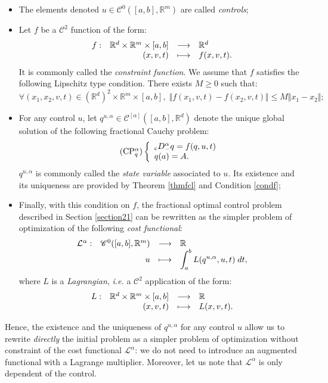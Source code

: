 \documentclass[english,11pt,reqno]{smfart}
\def\di{\displaystyle}
\newcommand{\R}{\mathbb{R}}
\newcommand{\LL}{\mathcal{L}}
\newcommand{\CC}{\mathscr{C}}
\newcommand{\cDM}{{}_{{\rm c}} D^\alpha_-}
\newcommand{\fonction}[5]{\begin{array}[t]{lrcl}#1 :&#2 &\longrightarrow &#3\\&#4& \longmapsto &#5 \end{array}}
\begin{document}
\begin{itemize}
\item The elements denoted $u \in \CC^0 ([a,b],\R^m)$ are called \textit{controls};
\item Let $f$ be a $\CC^2$ function of the form:
\begin{equation}
\fonction{f}{\R^d \times \R^m \times [a,b]}{\R^d}{(x,v,t)}{f(x,v,t).}
\end{equation}
It is commonly called the \textit{constraint function}. We assume that $f$ satisfies the following Lipschitz type condition. There exists $M \geq 0$ such that:
\begin{equation}\tag{$f_x$ lip}\label{condf}
\forall (x_1,x_2,v,t) \in (\R^d)^2 \times \R^m \times [a,b], \; \Vert f(x_1,v,t) - f(x_2,v,t) \Vert \leq M \Vert x_1 - x_2 \Vert ;
\end{equation}
\item For any control $u$, let $q^{u,\alpha} \in \CC^{[\alpha]} ([a,b],\R^d)$ denote the unique global solution of the following fractional Cauchy problem:
\begin{equation}\tag{CP${}^\alpha_q$}\label{eqcpq}
 \left\lbrace \begin{array}{l}
         \cDM q =f(q,u,t)\\
	     q(a) = A.
        \end{array}
\right.
\end{equation}
$q^{u,\alpha}$ is commonly called the \textit{state variable} associated to $u$. Its existence and its uniqueness are provided by Theorem \ref{thmfcl} and Condition \eqref{condf};
\item Finally, with this condition on $f$, the fractional optimal control problem described in Section \ref{section21} can be rewritten as the simpler problem of optimization of the following \textit{cost functional}:
\begin{equation}
\fonction{\LL^\alpha}{\CC^0 ([a,b],\R^m )}{\R}{u}{\di \int_{a}^{b} L ( q^{u,\alpha},u,t ) \; dt ,} 
\end{equation}
where $L$ is a \textit{Lagrangian}, \textit{i.e.} a $\CC^2$ application of the form:
\begin{equation}
\fonction{L}{\R^d \times \R^m \times [a,b]}{\R}{(x,v,t)}{L(x,v,t).}
\end{equation}
\end{itemize}
Hence, the existence and the uniqueness of $q^{u,\alpha}$ for any control $u$ allow us to rewrite \textit{directly} the initial problem as a simpler problem of optimization without constraint of the cost functional $\LL^\alpha$: we do not need to introduce an augmented functional with a Lagrange multiplier. Moreover, let us note that $\LL^\alpha$ is only dependent of the control. \\
\end{document}
